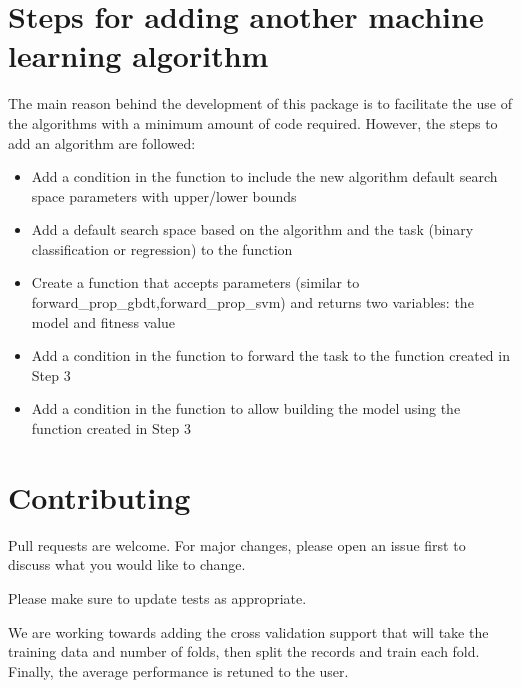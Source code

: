 \documentclass[letterpaper,10pt,english]{sphinxmanual}
\begin{document}
\chapter{Steps for adding another machine learning algorithm}
\label{\detokenize{index:steps-for-adding-another-machine-learning-algorithm}}
The main reason behind the development of this package is to facilitate the use of the algorithms with a minimum amount of code required. However, the steps to add an algorithm are followed:
\begin{itemize}
\item {} 
 Add a condition in the  function to include the new algorithm default search space parameters with upper/lower bounds

\item {} 
 Add a default search space based on the algorithm and the task (binary classification or regression) to the  function

\item {} 
 Create a function  that accepts parameters (similar to forward\_prop\_gbdt,forward\_prop\_svm) and returns two variables: the model and fitness value

\item {} 
 Add a condition in the function  to forward the task to the function created in Step 3

\item {} 
 Add a condition in the function  to allow building the model using the function created in Step 3

\end{itemize}


\chapter{Contributing}
\label{\detokenize{index:contributing}}
Pull requests are welcome. For major changes, please open an issue first
to discuss what you would like to change.

Please make sure to update tests as appropriate.

We are working towards adding the cross validation support that will take the training data and number of folds, then split the records and train each fold. Finally, the average performance is retuned to the user.
\end{document}

